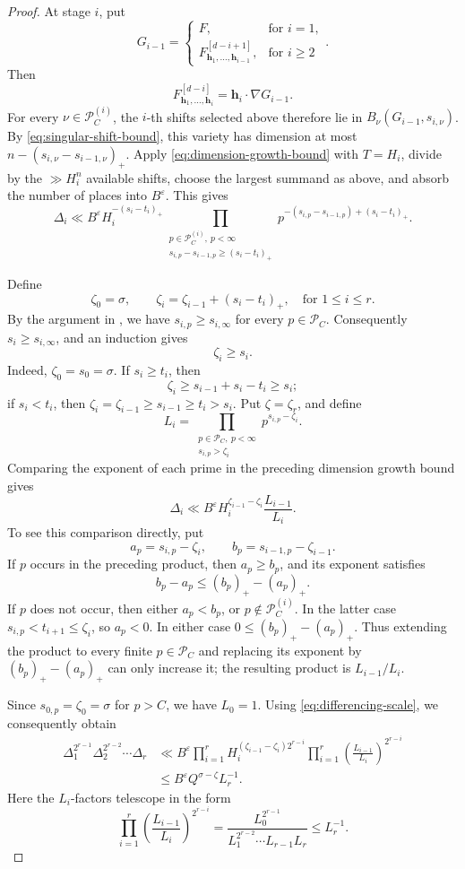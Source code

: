 \documentclass[reqno,a4paper,11pt]{amsart}
\numberwithin{equation}{section}
\newcommand{\h}{\mathbf h}
\newcommand{\eps}{\varepsilon}
\theoremstyle{plain}
\theoremstyle{definition}
\begin{document}
\begin{proof}
At stage \(i\), put
\[
 G_{i-1}=
 \begin{cases}
 F,&\text{for }i=1,\\
 F_{\h_1,\ldots,\h_{i-1}}^{[d-i+1]},&\text{for }i\geq2
 \end{cases}.
\]
Then
\[
 F_{\h_1,\ldots,\h_i}^{[d-i]}
 =\h_i\mathbin{\cdot}\nabla G_{i-1}.
\]
For every \(\nu\in\mathcal P_C^{(i)}\), the \(i\)-th shifts selected above therefore lie in \(B_\nu(G_{i-1},s_{i,\nu})\).
By \eqref{eq:singular-shift-bound}, this variety has dimension at most \(n-(s_{i,\nu}-s_{i-1,\nu})_+\).
Apply \eqref{eq:dimension-growth-bound} with \(T=H_i\), divide by the \(\gg H_i^n\) available shifts, choose the largest summand as above, and absorb the number of places into \(B^\eps\).
This gives
\[
 \Delta_i
 \ll B^\eps H_i^{-(s_i-t_i)_+}
 \prod_{\substack{p\in\mathcal P_C^{(i)},\ p<\infty\\
 s_{i,p}-s_{i-1,p}\geq(s_i-t_i)_+}}
 p^{-(s_{i,p}-s_{i-1,p})+(s_i-t_i)_+}.
\]

Define
\[
 \zeta_0=\sigma,
 \qquad
 \zeta_i=\zeta_{i-1}+(s_i-t_i)_+,
 \quad\text{for }1\leq i\leq r.
\]
By the argument in \cite[Proof of Lemma~3.5, following Eq.~(3.20)]{bp}, we have \(s_{i,p}\geq s_{i,\infty}\) for every \(p\in\mathcal P_C\).
Consequently \(s_i\geq s_{i,\infty}\), and an induction gives
\[
 \zeta_i\geq s_i.
\]
Indeed, \(\zeta_0=s_0=\sigma\).
If \(s_i\geq t_i\), then
\[
 \zeta_i\geq s_{i-1}+s_i-t_i\geq s_i;
\]
if \(s_i<t_i\), then \(\zeta_i=\zeta_{i-1}\geq s_{i-1}\geq t_i>s_i\).
Put \(\zeta=\zeta_r\), and define
\[
 L_i
 =
 \prod_{\substack{p\in\mathcal P_C,\ p<\infty\\
 s_{i,p}>\zeta_i}}
 p^{s_{i,p}-\zeta_i}.
\]
Comparing the exponent of each prime in the preceding dimension growth bound gives
\[
 \Delta_i
 \ll B^\eps
 H_i^{\zeta_{i-1}-\zeta_i}\frac{L_{i-1}}{L_i}.
\]
To see this comparison directly, put
\[
 a_p=s_{i,p}-\zeta_i,
 \qquad
 b_p=s_{i-1,p}-\zeta_{i-1}.
\]
If \(p\) occurs in the preceding product, then \(a_p\geq b_p\), and its exponent satisfies
\[
 b_p-a_p\leq(b_p)_+-(a_p)_+.
\]
If \(p\) does not occur, then either \(a_p<b_p\), or \(p\notin\mathcal P_C^{(i)}\).
In the latter case \(s_{i,p}<t_{i+1}\leq\zeta_i\), so \(a_p<0\).
In either case \(0\leq(b_p)_+-(a_p)_+\).
Thus extending the product to every finite \(p\in\mathcal P_C\) and replacing its exponent by \((b_p)_+-(a_p)_+\) can only increase it; the resulting product is \(L_{i-1}/L_i\).

Since \(s_{0,p}=\zeta_0=\sigma\) for \(p>C\), we have \(L_0=1\).
Using \eqref{eq:differencing-scale}, we consequently obtain
\[
 \begin{aligned}
 \Delta_1^{2^{r-1}}\Delta_2^{2^{r-2}}\cdots\Delta_r
 &\ll
 B^\eps
 \prod_{i=1}^r
 H_i^{(\zeta_{i-1}-\zeta_i)2^{r-i}}
 \prod_{i=1}^r
 \left(\frac{L_{i-1}}{L_i}\right)^{2^{r-i}}\\
 &\leq
 B^\eps Q^{\sigma-\zeta}L_r^{-1}.
 \end{aligned}
\]
Here the \(L_i\)-factors telescope in the form
\[
 \prod_{i=1}^r
 \left(\frac{L_{i-1}}{L_i}\right)^{2^{r-i}}
 =
 \frac{L_0^{2^{r-1}}}
 {L_1^{2^{r-2}}\cdots L_{r-1}L_r}
 \leq L_r^{-1}.
\]


\end{proof}
\end{document}
